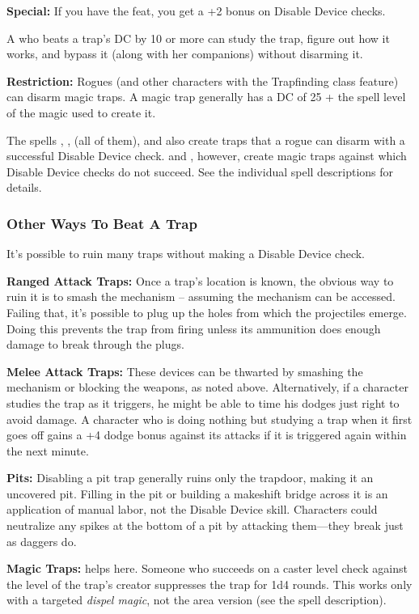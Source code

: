 \textbf{Special:} If you have the  feat, you get a +2 bonus on Disable 
Device checks.

A  who beats a trap's DC by 10 or more can study the trap, figure out how 
it works, and bypass it (along with her companions) without disarming it.

\textbf{Restriction:} Rogues (and other characters with the Trapfinding class feature) 
can disarm magic traps. A magic trap generally has a DC of 25 + the spell level 
of the magic used to create it.

The spells , ,  (all of them), and  also create traps that a rogue can disarm with a successful Disable Device 
check.  and , however, create magic traps 
against which Disable Device checks do not succeed. See the individual spell descriptions 
for details.

\subsubsection{Other Ways To Beat A Trap}

It's possible to ruin many traps without making a Disable Device check.

\textbf{Ranged Attack Traps:} Once a trap's location is known, the obvious way 
to ruin it is to smash the mechanism -- assuming the mechanism can be accessed. 
Failing that, it's possible to plug up the holes from which the projectiles emerge. 
Doing this prevents the trap from firing unless its ammunition does enough damage 
to break through the plugs.

\textbf{Melee Attack Traps:} These devices can be thwarted by smashing the mechanism 
or blocking the weapons, as noted above. Alternatively, if a character studies 
the trap as it triggers, he might be able to time his dodges just right to avoid 
damage. A character who is doing nothing but studying a trap when it first goes 
off gains a +4 dodge bonus against its attacks if it is triggered again within 
the next minute.

\textbf{Pits:} Disabling a pit trap generally ruins only the trapdoor, making it 
an uncovered pit. Filling in the pit or building a makeshift bridge across it is 
an application of manual labor, not the Disable Device skill. Characters could 
neutralize any spikes at the bottom of a pit by attacking them---they break just 
as daggers do.

\textbf{Magic Traps:}  helps here. Someone who succeeds on 
a caster level check against the level of the trap's creator suppresses the trap 
for 1d4 rounds. This works only with a targeted \textit{dispel magic}, not the 
area version (see the spell description).
